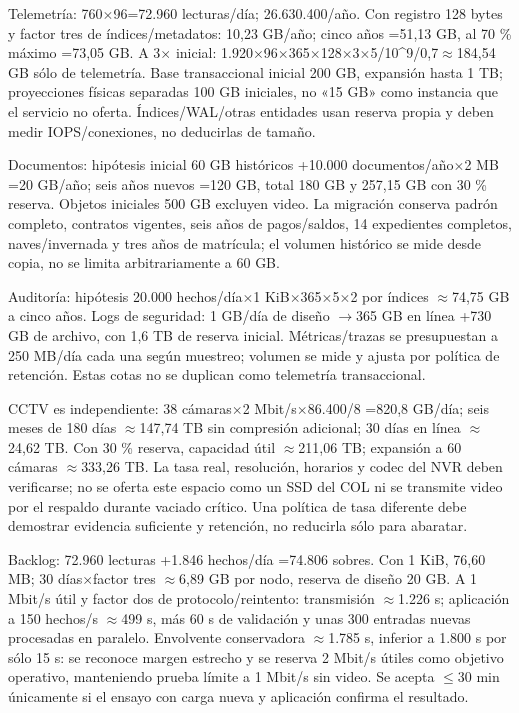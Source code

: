 \documentclass[11pt,letterpaper]{report}
\begin{document}
Telemetría: 760$\times$96=72.960 lecturas/día; 26.630.400/año. Con registro 128 bytes y factor tres de índices/metadatos: 10,23 GB/año; cinco años =51,13 GB, al 70 \% máximo =73,05 GB. A 3$\times$ inicial: 1.920$\times$96$\times$365$\times$128$\times$3$\times$5/10\textasciicircum{}9/0,7$\approx$184,54 GB sólo de telemetría. Base transaccional inicial 200 GB, expansión hasta 1 TB; proyecciones físicas separadas 100 GB iniciales, no «15 GB» como instancia que el servicio no oferta. Índices/WAL/otras entidades usan reserva propia y deben medir IOPS/conexiones, no deducirlas de tamaño.

Documentos: hipótesis inicial 60 GB históricos +10.000 documentos/año$\times$2 MB =20 GB/año; seis años nuevos =120 GB, total 180 GB y 257,15 GB con 30 \% reserva. Objetos iniciales 500 GB excluyen video. La migración conserva padrón completo, contratos vigentes, seis años de pagos/saldos, 14 expedientes completos, naves/invernada y tres años de matrícula; el volumen histórico se mide desde copia, no se limita arbitrariamente a 60 GB.

Auditoría: hipótesis 20.000 hechos/día$\times$1 KiB$\times$365$\times$5$\times$2 por índices $\approx$74,75 GB a cinco años. Logs de seguridad: 1 GB/día de diseño $\rightarrow$365 GB en línea +730 GB de archivo, con 1,6 TB de reserva inicial. Métricas/trazas se presupuestan a 250 MB/día cada una según muestreo; volumen se mide y ajusta por política de retención. Estas cotas no se duplican como telemetría transaccional.

CCTV es independiente: 38 cámaras$\times$2 Mbit/s$\times$86.400/8 =820,8 GB/día; seis meses de 180 días $\approx$147,74 TB sin compresión adicional; 30 días en línea $\approx$24,62 TB. Con 30 \% reserva, capacidad útil $\approx$211,06 TB; expansión a 60 cámaras $\approx$333,26 TB. La tasa real, resolución, horarios y codec del NVR deben verificarse; no se oferta este espacio como un SSD del COL ni se transmite video por el respaldo durante vaciado crítico. Una política de tasa diferente debe demostrar evidencia suficiente y retención, no reducirla sólo para abaratar.

Backlog: 72.960 lecturas +1.846 hechos/día =74.806 sobres. Con 1 KiB, 76,60 MB; 30 días$\times$factor tres $\approx$6,89 GB por nodo, reserva de diseño 20 GB. A 1 Mbit/s útil y factor dos de protocolo/reintento: transmisión $\approx$1.226 s; aplicación a 150 hechos/s $\approx$499 s, más 60 s de validación y unas 300 entradas nuevas procesadas en paralelo. Envolvente conservadora $\approx$1.785 s, inferior a 1.800 s por sólo 15 s: se reconoce margen estrecho y se reserva 2 Mbit/s útiles como objetivo operativo, manteniendo prueba límite a 1 Mbit/s sin video. Se acepta $\leq$30 min únicamente si el ensayo con carga nueva y aplicación confirma el resultado.
\end{document}
